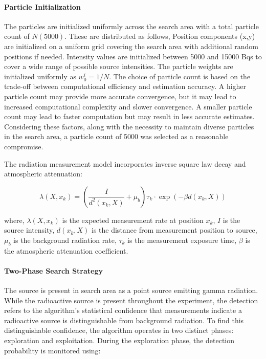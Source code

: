 \documentclass[../report.tex]{subfiles}
\begin{document}
    \paragraph{Particle Initialization}
    The particles are initialized uniformly across the search area with a total particle count of $N (5000)$. These are distributed as follows, Position components (x,y) are initialized on a 
    uniform grid covering the search area with additional random positions if needed. Intensity values are initialized between 5000 and 15000 Bqs to cover a wide range of 
    possible source intensities. The particle weights are initialized uniformly as $w_0^i = 1/N$. The choice of particle count is based on the trade-off 
    between computational efficiency and estimation accuracy. A higher particle count may provide more accurate convergence, but it may lead to increased 
    computational complexity and slower convergence. A smaller particle count may lead to faster computation but may result in less accurate estimates. Considering 
    these factors, along with the necessity to maintain diverse particles in the search area, a particle count of 5000 was selected as a reasonable compromise.


    The radiation measurement model incorporates inverse square law decay and atmospheric attenuation:

    \begin{equation}
    \lambda(X, x_k) = \left(\frac{I}{d^2(x_k, X)} + \mu_b\right)\tau_k \cdot \exp(-\beta d(x_k, X))
    \end{equation}

    where, $\lambda(X, x_k)$ is the expected measurement rate at position $x_k$, $I$ is the source intensity, $d(x_k, X)$ is the distance from measurement position to source, $\mu_b$ is the 
    background radiation rate, $\tau_k$ is the measurement exposure time, $\beta$ is the atmospheric attenuation coefficient.

    \paragraph{Two-Phase Search Strategy}
    The source is present in search area as a point source emitting gamma radiation. While the radioactive source is present throughout the experiment, the 
    detection refers to the algorithm's statistical confidence that measurements indicate a radioactive source is distinguishable from background radiation. To
    find this distinguishable confidence, the algorithm operates in two distinct phases: exploration and exploitation. 
    During the exploration phase, the detection probability is monitored using:
\end{document}

